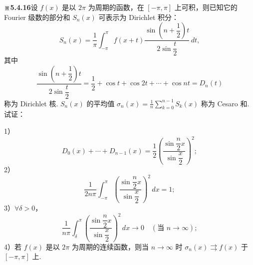 \documentclass[UTF8,12pt,a4paper,fontset=fandol]{ctexart}
\begin{document}
\noindent\textbf{※5.4.16}\quad 设 $f(x)$ 是以 $2\pi$ 为周期的函数，在 $[-\pi,\pi]$ 上可积，则已知它的 Fourier 级数的部分和
$S_n(x)$ 可表示为 Dirichlet 积分：
\[
  S_n(x)=\frac1\pi\int_{-\pi}^{\pi}f(x+t)
  \frac{\sin\left(n+\dfrac12\right)t}{2\sin\dfrac t2}\,dt,
\]
其中
\[
  \frac{\sin\left(n+\dfrac12\right)t}{2\sin\dfrac t2}
  =\frac12+\cos t+\cos2t+\cdots+\cos nt=D_n(t)
\]
称为 Dirichlet 核. $S_n(x)$ 的平均值
$\displaystyle\sigma_n(x)=\frac1n\sum_{k=0}^{n-1}S_k(x)$ 称为 Cesaro 和. 试证：

1）
\[
  D_0(x)+\cdots+D_{n-1}(x)=\frac12\left(\frac{\sin\dfrac n2x}{\sin\dfrac x2}\right)^2;
\]
2）
\[
  \frac1{2n\pi}\int_{-\pi}^{\pi}
  \left(\frac{\sin\dfrac n2x}{\sin\dfrac x2}\right)^2\,dx=1;
\]
3）$\forall\delta>0$，
\[
  \frac1{n\pi}\int_{\delta}^{\pi}
  \left(\frac{\sin\dfrac n2x}{\sin\dfrac x2}\right)^2\,dx\to0
  \quad(\text{当 }n\to\infty);
\]
4）若 $f(x)$ 是以 $2\pi$ 为周期的连续函数，则当 $n\to\infty$ 时
$\sigma_n(x)\rightrightarrows f(x)$ 于 $[-\pi,\pi]$ 上.
\end{document}
